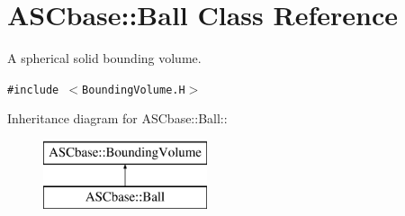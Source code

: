 \section{ASCbase::Ball Class Reference}
\label{classASCbase_1_1Ball}
A spherical solid bounding volume.  


{\tt \#include $<$Bounding\-Volume.H$>$}

Inheritance diagram for ASCbase::Ball::\begin{figure}[H]
\begin{center}
\leavevmode
\includegraphics[height=2cm]{classASCbase_1_1Ball}
\end{center}
\end{figure}
